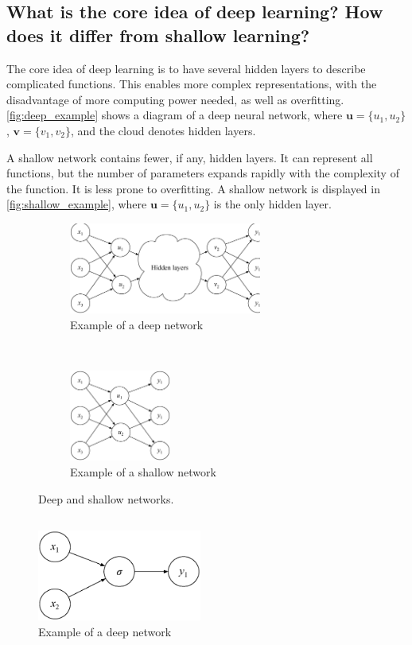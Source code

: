 \documentclass[../main.tex]{subfiles}
\begin{document}
\subsection{What is the core idea of deep learning? How does it differ from shallow learning?}

The core idea of deep learning is to have several hidden layers to describe complicated functions. This enables more complex representations, with the disadvantage of more computing power needed, as well as overfitting. \autoref{fig:deep_example} shows a diagram of a deep neural network, where $\mathbf{u}=\{u_1, u_2\}$, $\mathbf{v}=\{v_1, v_2\}$, and the cloud denotes hidden layers. 

A shallow network contains fewer, if any, hidden layers. It can represent all functions, but the number of parameters expands rapidly with the complexity of the function. It is less prone to overfitting. A shallow network is displayed in \autoref{fig:shallow_example}, where $\mathbf{u}=\{u_1, u_2\}$ is the only hidden layer.

\begin{figure}
    \centering
    \begin{subfigure}[b]{0.48\textwidth}
    	\centering
        \includegraphics[height=3cm]{figures/theory/deep_network}
        \caption{Example of a deep network}
        \label{fig:deep_example}
    \end{subfigure}
    ~
    \begin{subfigure}[b]{0.48\textwidth}
    	\centering
        \includegraphics[height=3cm]{figures/theory/shallow_network}
        \caption{Example of a shallow network}
        \label{fig:shallow_example}
    \end{subfigure}
    \caption{Deep and shallow networks.}\label{fig:deep_shallow}
\end{figure}


\subsection{}

\begin{subfigure}
	\centering
    \includegraphics[height=3cm]{figures/theory/log_network}
    \caption{Example of a deep network}
    \label{fig:log_example}
\end{subfigure}
\end{document}
